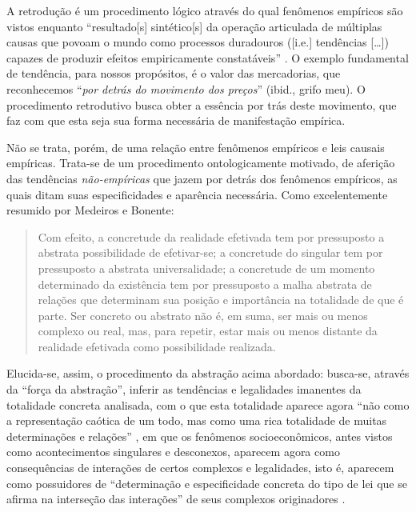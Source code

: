 A retrodução é um procedimento lógico através do qual fenômenos empíricos são vistos enquanto ``resultado{[}s{]} sintético{[}s{]} da operação articulada de múltiplas causas que povoam o mundo como processos duradouros ({[}i.e.{]} tendências {[}\ldots{]}) capazes de produzir efeitos empiricamente constatáveis'' \parencite[p. 83]{Medeiros2021a}. O exemplo fundamental de tendência, para nossos propósitos, é o valor das mercadorias, que reconhecemos ``\emph{por detrás do movimento dos preços}'' (ibid., grifo meu). O procedimento retrodutivo busca obter a essência por trás deste movimento, que faz com que esta seja sua forma necessária de manifestação empírica.

Não se trata, porém, de uma relação entre fenômenos empíricos e leis causais empíricas. Trata-se de um procedimento ontologicamente motivado, de aferição das tendências \emph{não-empíricas} que jazem por detrás dos fenômenos empíricos, as quais ditam suas especificidades e aparência necessária. Como excelentemente resumido por Medeiros e Bonente:

\begin{quote}
Com efeito, a concretude da realidade efetivada tem por pressuposto a abstrata possibilidade de efetivar-se; a concretude do singular tem por pressuposto a abstrata universalidade; a concretude de um momento determinado da existência tem por pressuposto a malha abstrata de relações que determinam sua posição e importância na totalidade de que é parte. Ser concreto ou abstrato não é, em suma, ser mais ou menos complexo ou real, mas, para repetir, estar mais ou menos distante da realidade efetivada como possibilidade realizada. \parencite[p. 86-7]{Medeiros2021a}
\end{quote}

Elucida-se, assim, o procedimento da abstração acima abordado: busca-se, através da ``força da abstração'', inferir as tendências e legalidades imanentes da totalidade concreta analisada, com o que esta totalidade aparece agora ``não como a representação caótica de um todo, mas como uma rica totalidade de muitas determinações e relações'' \parencite[p. 54]{Marx2011}, em que os fenômenos socioeconômicos, antes vistos como acontecimentos singulares e desconexos, aparecem agora como consequências de interações de certos complexos e legalidades, isto é, aparecem como possuidores de ``determinação e especificidade concreta do tipo de lei que se afirma na interseção das interações'' de seus complexos originadores \parencite[p. 338]{Lukacs2012}.

